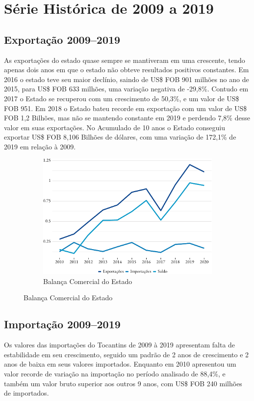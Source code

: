 \section{Série Histórica de 2009 a 2019}

\subsection {Exportação 2009--2019}
\par As exportações do estado quase sempre se mantiveram em uma crescente, tendo
apenas dois anos em que o estado não obteve resultados positivos constantes. Em 2016 o estado teve seu maior declínio, saindo de US\$ FOB 901 milhões no ano de 2015, para US\$ FOB 633 milhões, uma variação negativa de  -29,8\%. 
Contudo em 2017 o Estado se recuperou com um crescimento de 50,3\%, e um valor de US\$ FOB 951. Em 2018 o Estado bateu recorde em exportação com um valor de US\$ FOB 1,2 Bilhões, mas não se mantendo constante em 2019 e perdendo 7,8\% desse valor em suas exportações.
No Acumulado de 10 anos o Estado conseguiu exportar US\$ FOB 8,106 Bilhões de dólares, com uma variação de 172,1\% de 2019 em relação à 2009.

\begin{figure}[!h]
		\begin{subfigure}{\linewidth}
		\caption{Balança Comercial do Estado}
		\includegraphics{fig/total-1.pdf}
	\end{subfigure}
\end{figure}

\subsection{Importação 2009--2019}
\par Os valores das importações do Tocantins de 2009 à 2019 apresentam falta de estabilidade em seu crescimento, seguido um padrão de 2 anos de crescimento e 2 anos de baixa em seus valores importados. Enquanto em 2010 apresentou um valor recorde de variação na importação no período analisado de 88,4\%, e também um valor bruto superior aos outros 9 anos, com US\$ FOB 240 milhões de importados.

